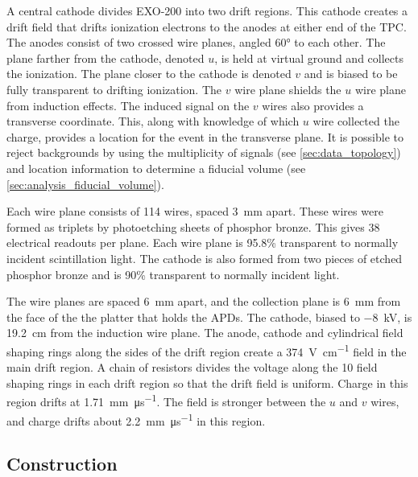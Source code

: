 \documentclass[herrin-thesis.tex]{subfiles}
\begin{document}
A central cathode divides EXO-200 into two drift regions. This cathode creates a drift field that drifts ionization electrons to the anodes at either end of the TPC. The anodes consist of two crossed wire planes, angled \ang{60} to each other. The plane farther from the cathode, denoted \(u\), is held at virtual ground and collects the ionization. The plane closer to the cathode is denoted \(v\) and is biased to be fully transparent to drifting ionization. The \(v\) wire plane shields the \(u\) wire plane from induction effects. The induced signal on the \(v\) wires also provides a transverse coordinate. This, along with knowledge of which \(u\) wire collected the charge, provides a location for the event in the transverse plane. It is possible to reject backgrounds by using the multiplicity of signals (see \cref{sec:data_topology}) and location information to determine a fiducial volume (see \cref{sec:analysis_fiducial_volume}).

Each wire plane consists of 114 wires, spaced \SI{3}{\mm} apart. These wires were formed as triplets by photoetching sheets of phosphor bronze. This gives 38 electrical readouts per plane. Each wire plane is 95.8\% transparent to normally incident scintillation light. The cathode is also formed from two pieces of etched phosphor bronze and is 90\% transparent to normally incident light.

The wire planes are spaced \SI{6}{\mm} apart, and the collection plane is \SI{6}{\mm} from the face of the the platter that holds the APDs. The cathode, biased to \SI{-8}{\kV}, is \SI{19.2}{\cm} from the induction wire plane. The anode, cathode and cylindrical field shaping rings along the sides of the drift region create a \SI{374}{\V\per\cm} field in the main drift region. A chain of resistors divides the voltage along the 10 field shaping rings in each drift region so that the drift field is uniform. Charge in this region drifts at \SI{1.71}{\mm\per\micro\s}. The field is stronger between the \(u\) and \(v\) wires, and charge drifts about \SI{2.2}{\mm\per\micro\s} in this region.

\subsection{Construction}
\end{document}

